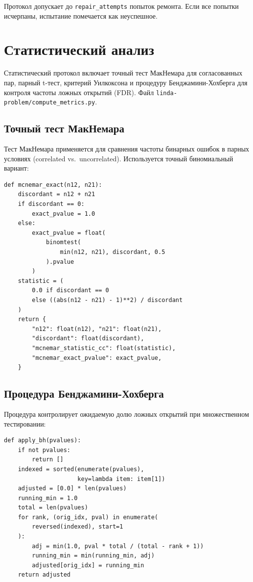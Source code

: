 Протокол допускает до \texttt{repair\_attempts} попыток ремонта. Если все попытки исчерпаны, испытание помечается как неуспешное.

\section{Статистический анализ}
\label{sec:appC_stats}

Статистический протокол включает точный тест МакНемара для согласованных пар, парный t-тест, критерий Уилкоксона и процедуру Бенджамини-Хохберга для контроля частоты ложных открытий (FDR). Файл \texttt{linda-problem/compute\_metrics.py}.

\subsection{Точный тест МакНемара}

Тест МакНемара применяется для сравнения частоты бинарных ошибок в парных условиях (correlated vs.\ uncorrelated). Используется точный биномиальный вариант:

\begin{lstlisting}
def mcnemar_exact(n12, n21):
    discordant = n12 + n21
    if discordant == 0:
        exact_pvalue = 1.0
    else:
        exact_pvalue = float(
            binomtest(
                min(n12, n21), discordant, 0.5
            ).pvalue
        )
    statistic = (
        0.0 if discordant == 0
        else ((abs(n12 - n21) - 1)**2) / discordant
    )
    return {
        "n12": float(n12), "n21": float(n21),
        "discordant": float(discordant),
        "mcnemar_statistic_cc": float(statistic),
        "mcnemar_exact_pvalue": exact_pvalue,
    }
\end{lstlisting}

\subsection{Процедура Бенджамини-Хохберга}

Процедура контролирует ожидаемую долю ложных открытий при множественном тестировании:

\begin{lstlisting}
def apply_bh(pvalues):
    if not pvalues:
        return []
    indexed = sorted(enumerate(pvalues),
                     key=lambda item: item[1])
    adjusted = [0.0] * len(pvalues)
    running_min = 1.0
    total = len(pvalues)
    for rank, (orig_idx, pval) in enumerate(
        reversed(indexed), start=1
    ):
        adj = min(1.0, pval * total / (total - rank + 1))
        running_min = min(running_min, adj)
        adjusted[orig_idx] = running_min
    return adjusted
\end{lstlisting}

